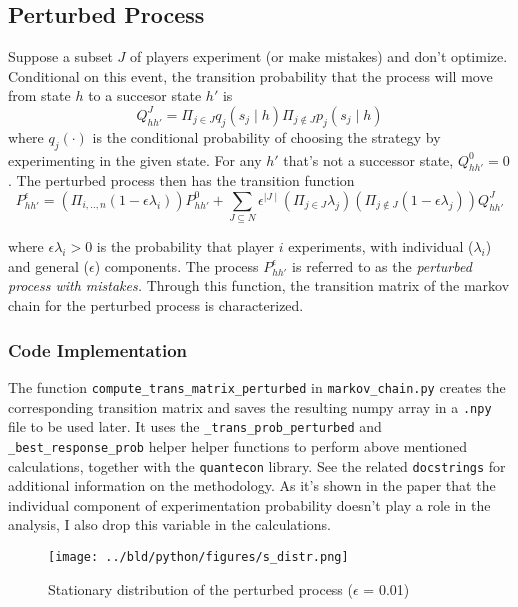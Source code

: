 \documentclass[11pt, a4paper, leqno]{article}
\begin{document}
\subsection{Perturbed Process} %
\label{subsec:mc_p}

Suppose a subset $J$ of players experiment (or make mistakes) and don't optimize. Conditional on this
event, the transition probability that the process will move from state $h$ to a succesor
 state $h'$ is
\[ Q_{hh'}^{J} = \Pi_{j \in J} q_j(s_j \mid h) \Pi_{j \notin J} p_j(s_j \mid h) \]
where $ q_j(\cdot)$ is the conditional probability of choosing the strategy by experimenting in the given
state. For any $h'$ that's not a successor state, $Q_{hh'}^{0} = 0$. The perturbed process then has
the transition function
\[ P_{hh'}^{\epsilon} = \left (\Pi_{i,..,n} (1- \epsilon \lambda_i) \right ) P_{hh'}^{0} +
                         \sum_{J \subseteq N} \epsilon ^{\mid J \mid} \left ( \Pi_{j \in J} \lambda_j \right ) \left ( \Pi_{j \notin J} (1- \epsilon \lambda_j)\right ) Q_{hh'}^{J} \]

where $ \epsilon \lambda_i > 0$ is the probability that player $i$ experiments, with individual ($\lambda_i$)
and general ($\epsilon$) components. The process $P_{hh'}^{\epsilon}$ is referred to as the
\textit{perturbed process with mistakes.} Through this function, the transition matrix of the markov chain for the perturbed process is characterized.


\subsubsection*{Code Implementation}
The function \texttt{compute\_trans\_matrix\_perturbed} in \texttt{markov\_chain.py} creates the
corresponding transition matrix and saves the resulting numpy array in a \texttt{.npy} file to be
used later. It uses the \texttt{\_trans\_prob\_perturbed} and \texttt{\_best\_response\_prob} helper
helper functions to perform above mentioned calculations, together with the \texttt{quantecon} library.
See the related \texttt{docstrings} for additional information on the methodology. As it's shown in
the paper that the individual component of experimentation probability doesn't play a role in
the analysis, I also drop this variable in the calculations.

\begin{figure}[H]

    \centering
    \texttt{[image: ../bld/python/figures/s\_distr.png]}

    \caption{Stationary distribution of the perturbed process ($\epsilon$ = 0.01)}
    \label{fig:python-sd}

\end{figure}
\end{document}

